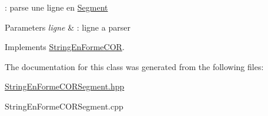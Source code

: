 \+: parse une ligne en \mbox{\hyperlink{class_segment}{Segment}} 


\begin{DoxyParams}{Parameters}
{\em ligne} & \+: ligne a parser \\
\hline
\end{DoxyParams}


Implements \mbox{\hyperlink{class_string_en_forme_c_o_r}{String\+En\+Forme\+C\+OR}}.



The documentation for this class was generated from the following files\+:\begin{DoxyCompactItemize}
\item 
\mbox{\hyperlink{_string_en_forme_c_o_r_segment_8hpp}{String\+En\+Forme\+C\+O\+R\+Segment.\+hpp}}\item 
String\+En\+Forme\+C\+O\+R\+Segment.\+cpp\end{DoxyCompactItemize}
